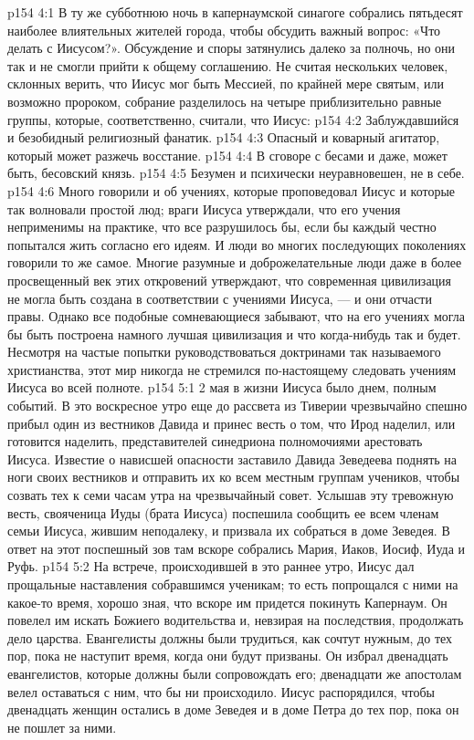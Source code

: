 \vs p154 4:1 В ту же субботнюю ночь в капернаумской синагоге собрались пятьдесят наиболее влиятельных жителей города, чтобы обсудить важный вопрос: «Что делать с Иисусом?». Обсуждение и споры затянулись далеко за полночь, но они так и не смогли прийти к общему соглашению. Не считая нескольких человек, склонных верить, что Иисус мог быть Мессией, по крайней мере святым, или возможно пророком, собрание разделилось на четыре приблизительно равные группы, которые, соответственно, считали, что Иисус:
\vs p154 4:2 \bibnobreakspace Заблуждавшийся и безобидный религиозный фанатик.
\vs p154 4:3 \bibnobreakspace Опасный и коварный агитатор, который может разжечь восстание.
\vs p154 4:4 \bibnobreakspace В сговоре с бесами и даже, может быть, бесовский князь.
\vs p154 4:5 \bibnobreakspace Безумен и психически неуравновешен, не в себе.
\vs p154 4:6 \pc Много говорили и об учениях, которые проповедовал Иисус и которые так волновали простой люд; враги Иисуса утверждали, что его учения неприменимы на практике, что все разрушилось бы, если бы каждый честно попытался жить согласно его идеям. И люди во многих последующих поколениях говорили то же самое. Многие разумные и доброжелательные люди даже в более просвещенный век этих откровений утверждают, что современная цивилизация не могла быть создана в соответствии с учениями Иисуса, --- и они отчасти правы. Однако все подобные сомневающиеся забывают, что на его учениях могла бы быть построена намного лучшая цивилизация и что когда\hyp{}нибудь так и будет. Несмотря на частые попытки руководствоваться доктринами так называемого христианства, этот мир никогда не стремился по\hyp{}настоящему следовать учениям Иисуса во всей полноте.
\vs p154 5:1 2 мая в жизни Иисуса было днем, полным событий. В это воскресное утро еще до рассвета из Тиверии чрезвычайно спешно прибыл один из вестников Давида и принес весть о том, что Ирод наделил, или готовится наделить, представителей синедриона полномочиями арестовать Иисуса. Известие о нависшей опасности заставило Давида Зеведеева поднять на ноги своих вестников и отправить их ко всем местным группам учеников, чтобы созвать тех к семи часам утра на чрезвычайный совет. Услышав эту тревожную весть, свояченица Иуды (брата Иисуса) поспешила сообщить ее всем членам семьи Иисуса, жившим неподалеку, и призвала их собраться в доме Зеведея. В ответ на этот поспешный зов там вскоре собрались Мария, Иаков, Иосиф, Иуда и Руфь.
\vs p154 5:2 На встрече, происходившей в это раннее утро, Иисус дал прощальные наставления собравшимся ученикам; то есть попрощался с ними на какое\hyp{}то время, хорошо зная, что вскоре им придется покинуть Капернаум. Он повелел им искать Божиего водительства и, невзирая на последствия, продолжать дело царства. Евангелисты должны были трудиться, как сочтут нужным, до тех пор, пока не наступит время, когда они будут призваны. Он избрал двенадцать евангелистов, которые должны были сопровождать его; двенадцати же апостолам велел оставаться с ним, что бы ни происходило. Иисус распорядился, чтобы двенадцать женщин остались в доме Зеведея и в доме Петра до тех пор, пока он не пошлет за ними.
